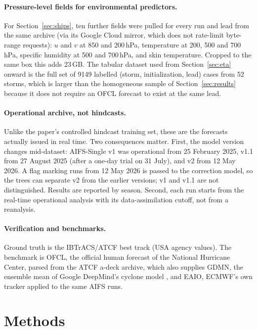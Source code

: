 \documentclass[11pt]{article}
\begin{document}
\paragraph{Pressure-level fields for environmental predictors.} For Section~\ref{sec:ships}, ten
further fields were pulled for every run and lead from the same archive (via its Google Cloud
mirror, which does not rate-limit byte-range requests): $u$ and $v$ at 850 and 200\,hPa,
temperature at 200, 500 and 700\,hPa, specific humidity at 500 and 700\,hPa, and skin
temperature. Cropped to the same box this adds 23\,GB. The tabular dataset used from
Section~\ref{sec:eta} onward is the full set of 9149 labelled (storm, initialization, lead)
cases from 52 storms, which is larger than the homogeneous sample of Section~\ref{sec:results}
because it does not require an OFCL forecast to exist at the same lead.

\paragraph{Operational archive, not hindcasts.} Unlike the paper's controlled hindcast training
set, these are the forecasts actually issued in real time. Two consequences matter. First, the
model version changes mid-dataset: AIFS-Single v1 was operational from 25 February 2025, v1.1
from 27 August 2025 (after a one-day trial on 31 July), and v2 from 12 May 2026. A flag marking
runs from 12 May 2026 is passed to the correction model, so the trees can separate v2 from the
earlier versions; v1 and v1.1 are not distinguished. Results are reported by season. Second, each run starts from the real-time operational analysis with its
data-assimilation cutoff, not from a reanalysis.

\paragraph{Verification and benchmarks.} Ground truth is the IBTrACS/ATCF best track (USA agency
values). The benchmark is OFCL, the official human forecast of the National Hurricane Center,
parsed from the ATCF a-deck archive, which also supplies GDMN, the ensemble mean of Google
DeepMind's cyclone model \citep{deepmind2025weatherlab}, and EAIO, ECMWF's own tracker applied to
the same AIFS runs.

\section{Methods}
\end{document}

